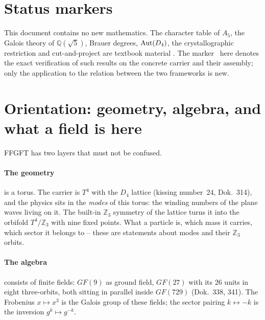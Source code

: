 \section*{Status markers}


This document contains no new mathematics. The character table of $A_5$,
the Galois theory of $\mathbb{Q}(\sqrt5)$, Brauer degrees, ${\rm Aut}(D_4)$,
the crystallographic restriction and cut-and-project are textbook material
\EM. The marker \BM\ here denotes the exact verification of such results
on the concrete carrier and their assembly; only the application to the
relation between the two frameworks is new.

\section{Orientation: geometry, algebra, and what a field is here}

FFGFT has two layers that must not be confused.

\paragraph{The geometry} is a torus. The carrier is $T^4$ with the $D_4$
lattice (kissing number~24, Dok.~314), and the physics sits in the
\emph{modes} of this torus: the winding numbers of the plane waves living
on it. The built-in $\mathbb{Z}_3$ symmetry of the lattice turns it into
the orbifold $T^4/\mathbb{Z}_3$ with nine fixed points. What a particle is,
which mass it carries, which sector it belongs to -- these are statements
about modes and their $\mathbb{Z}_3$ orbits.

\paragraph{The algebra} consists of finite fields: $GF(9)$ as ground
field, $GF(27)$ with its 26 units in eight three-orbits, both sitting in
parallel inside $GF(729)$ (Dok.~338, 341). The Frobenius $x\mapsto x^3$ is
the Galois group of these fields; the sector pairing
$k\leftrightarrow-k$ is the inversion $g^k\mapsto g^{-k}$.

